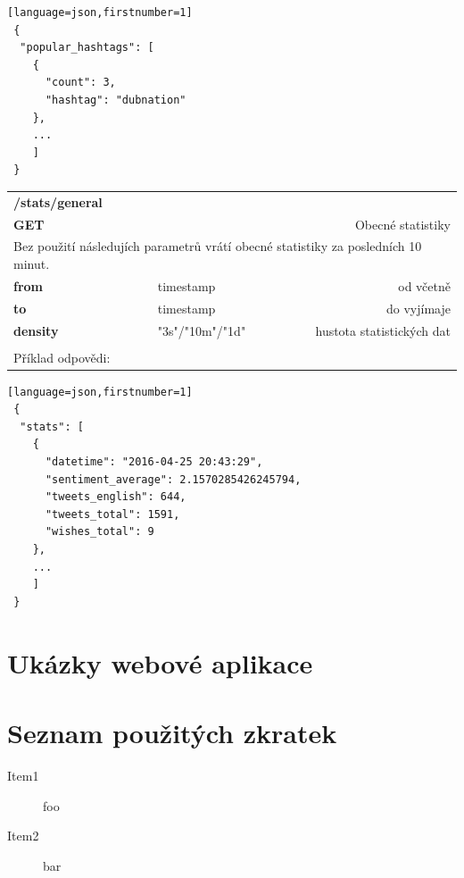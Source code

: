 \documentclass[thesis=B,czech]{FITthesis}[2012/06/26]
\begin{document}
\begin{lstlisting}[float=H][language=json,firstnumber=1]
 {
  "popular_hashtags": [
    {
      "count": 3,
      "hashtag": "dubnation"
    },
    ...
    ]
 }
\end{lstlisting} 


\begin{table}[h]
\begin{tabular}{llllr}
\rowcolor[HTML]{EFEFEF}
\large \textbf{/stats/general}        &         &                 &        & \multicolumn{1}{l}{}                \\
\rowcolor[HTML]{EFEFEF}
\textbf{GET}          &         &                 &        & Obecné statistiky                        \\
\multicolumn{5}{l}{\parbox[t]{12.8cm}{Bez použití následujích parametrů vrátí obecné statistiky za posledních 10 minut.  }  } \\
\textbf{from}         &         & timestamp       &        & od včetně                           \\
\textbf{to}           &         & timestamp       &        & do vyjímaje                         \\
\textbf{density}        &         & "3s"/"10m"/"1d"         &        & hustota statistických dat   \\
 & & & & \\
 Příklad odpovědi:   \\
\end{tabular}
\end{table}

\begin{lstlisting}[float=H][language=json,firstnumber=1]
 {
  "stats": [
    {
      "datetime": "2016-04-25 20:43:29",
      "sentiment_average": 2.1570285426245794,
      "tweets_english": 644,
      "tweets_total": 1591,
      "wishes_total": 9
    },
    ...
    ]
 }
\end{lstlisting}

\chapter{Ukázky webové aplikace}
\label{appendix-web}

\chapter{Seznam použitých zkratek}
\begin{description}
	\item[Item1] foo
	\item[Item2] bar
\end{description}
\end{document}
